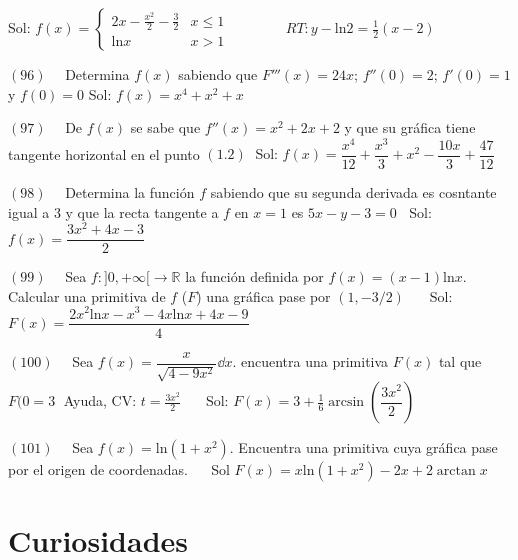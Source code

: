 {\textcolor{gris}{Sol: $f(x)=\begin{cases}
2x-\frac {x^2}{2}-\frac 3 2 & x\le 1 \\
\mathrm{ln} x & x>1	
\end{cases} \qquad \qquad  RT: y-\mathrm{ln}2=\frac 1 2 (x-2)
$ }

\hspace{-7mm} $(96) \quad $ Determina $f(x)$ sabiendo que $F'''(x)=24x$; $f''(0)=2$; $f'(0)=1$ y $f(0)=0$ 
\textcolor{gris}{ Sol: $f(x)=x^4+x^2+x$ }

\hspace{-7mm} $(97) \quad $ De $f(x)$ se sabe que $f''(x)=x^2+2x+2$ y que su gráfica tiene tangente horizontal en el punto $(1.2)\; $
\textcolor{gris}{ Sol: $f(x)=\dfrac {x^4}{12}+\dfrac {x^3}{3} + x^2 - \dfrac {10 x}{3} + \dfrac {47}{12}$ }

\hspace{-7mm} $(98) \quad $ Determina la función $f$ sabiendo que su segunda derivada es cosntante igual a $3$ y que la recta tangente a $f$ en $x=1$ es $5x-y-3=0 \; \; $ \textcolor{gris}{ Sol: $f(x)=\dfrac {3x^2+4x-3}{2}$}

\hspace{-7mm} $(99) \quad $ Sea $f:]0,+\infty[ \to \mathbb R$ la función definida por $f(x)=(x-1)\mathrm{ln}x$. Calcular una primitiva de $f$ ($F$) una gráfica pase por $(1,-3/2)\;\;$ \textcolor{gris}{ $\; \;  $ Sol:  $F(x)= \dfrac {2x^2 \mathrm{ln} x -x^3 -4x \mathrm{ln} x+4x-9}{4}$ }

\hspace{-7mm} $(100) \quad $ Sea $f(x)= \dfrac {x}{\sqrt{4-9x^2}} \dd x$.
encuentra una primitiva $F(x)$ tal que $F(0=3 \; $ 
\textcolor{gris}{Ayuda, CV: $t = \frac {3x^2}{2} \; $}
\textcolor{gris}{$\; \; \;$ Sol: $F(x)=3 + \frac 1 6 \arcsin \left( \dfrac {3x^2}{2} \right) $ }

\hspace{-7mm} $(101) \quad $ Sea  $f(x)=\mathrm{ln}(1+x^2)$. Encuentra una primitiva cuya gráfica pase por el origen de coordenadas.
\textcolor{gris}{$\quad$ Sol $F(x)=x\mathrm{ln}(1+x^2)-2x+2\arctan x$}

\section{Curiosidades}

\vspace{3mm}

}
